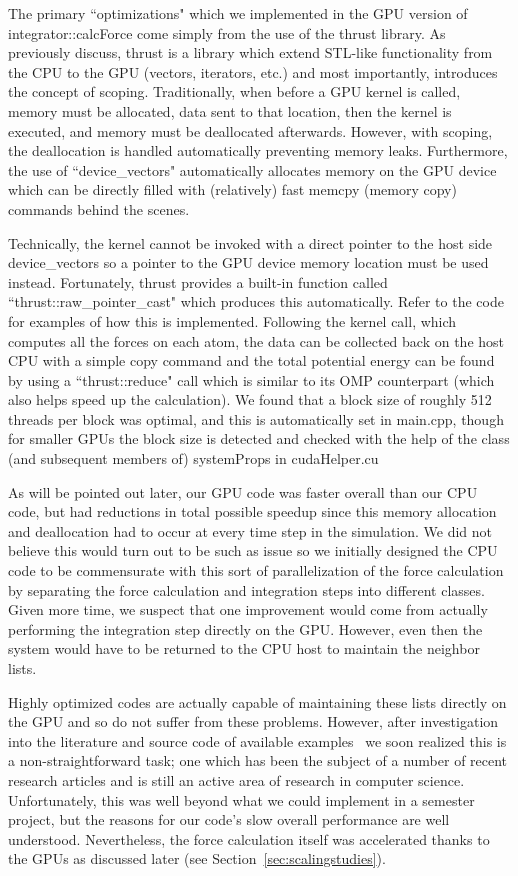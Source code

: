 \documentclass[12pt]{article}
\begin{document}
\begin{description}
The primary ``optimizations" which we implemented in the GPU version of integrator::calcForce come simply from the use of the thrust library.  As previously discuss, thrust is a library which extend STL-like functionality from the CPU to the GPU (vectors, iterators, etc.) and most importantly, introduces the concept of scoping.  Traditionally, when before a GPU kernel is called, memory must be allocated, data sent to that location, then the kernel is executed, and memory must be deallocated afterwards.  However, with scoping, the deallocation is handled automatically preventing memory leaks.  Furthermore, the use of ``device\_vectors" automatically allocates memory on the GPU device which can be directly filled with (relatively) fast memcpy (memory copy) commands behind the scenes.

Technically, the kernel cannot be invoked with a direct pointer to the host side device\_vectors so a pointer to the GPU device memory location must be used instead.  Fortunately, thrust provides a built-in function called ``thrust::raw\_pointer\_cast" which produces this automatically.  Refer to the code for examples of how this is implemented.  Following the kernel call, which computes all the forces
on each atom, the data can be collected back on the host CPU with a simple copy command and the total potential energy can be found by using a ``thrust::reduce" call which is similar to its OMP counterpart (which also helps speed up the calculation).  We found that a block size of roughly 512 threads per block was optimal, and this is automatically set in main.cpp, though for smaller GPUs the block size is detected and checked with the help of the class (and subsequent members of) systemProps in cudaHelper.cu

As will be pointed out later, our GPU code was faster overall than our CPU code, but had reductions in total possible speedup since this memory allocation and deallocation had to occur at every time step in the simulation.  We did not believe this would turn out to be such as issue so we initially designed the CPU code to be commensurate with this sort of parallelization of the force calculation by separating the force calculation and integration steps into different classes.  Given more time, we suspect that one improvement would come from actually performing the integration step directly on the GPU.  However, even then the system would have to be returned to the CPU host to maintain the neighbor lists.

Highly optimized codes are actually capable of maintaining these lists directly on the GPU and so do not suffer from these problems.  However, after investigation into the literature and source code of available examples~\cite{Anderson2008, Lipscomb2012} we soon realized this is a non-straightforward task; one which has been the subject of a number of recent research articles and is still an active area of research in computer science.  Unfortunately, this was well beyond what we could implement in a semester project, but the reasons for our code's slow overall performance are well understood.  Nevertheless, the force calculation itself was accelerated thanks to the GPUs as discussed later (see Section~\ref{sec:scalingstudies}).


\end{description}
\end{document}

